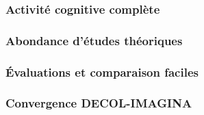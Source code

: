\subsubsection{Activité cognitive complète}

\subsubsection{Abondance d'études théoriques}

\subsubsection{Évaluations et comparaison faciles}

\subsubsection{Convergence DECOL-IMAGINA}